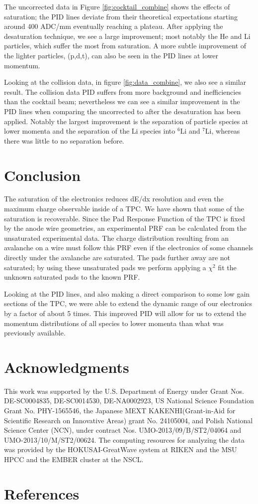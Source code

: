 \documentclass[review]{elsarticle}
\begin{document}
The uncorrected data in Figure \ref{fig:cocktail_combine} shows the effects of saturation; the PID lines deviate from their theoretical expectations starting around 400 ADC/mm eventually reaching a plateau. After applying the desaturation technique, we see a large improvement; most notably the He and Li particles, which suffer the most from saturation. A more subtle improvement of the lighter particles, (p,d,t), can also be seen in the PID lines at lower momentum.

Looking at the collision data, in figure \ref{fig:data_combine}, we also see a similar result. The collision data PID suffers from more background and inefficiencies than the cocktail beam; nevertheless we can see a similar improvement in the PID lines when comparing the uncorrected to after the desaturation has been applied. Notably the largest improvement is the separation of particle species at lower momenta and the separation of the Li species into ${}^{6}$Li and ${}^{7}$Li, whereas there was little to no separation before. 

\clearpage

\section{Conclusion}

The saturation  of the electronics reduces dE/dx resolution and even the maximum charge observable inside of a TPC.  We have shown that some of the saturation is recoverable. Since the Pad Response Function of the TPC is fixed by the anode wire geometries, an experimental PRF can be calculated from the unsaturated experimental data. The charge distribution resulting from an avalanche on a wire must follow this PRF even if the electronics of some channels directly under the avalanche are saturated. The pads further away are not saturated; by using these unsaturated pads we perform applying a $\chi^2$  fit the unknown saturated pads to the known PRF. 

Looking at the PID lines, and also making a direct comparison to some low gain sections of the TPC, we were able to extend the dynamic range of our electronics by a factor of about 5 times. This improved PID will allow for us to extend the momentum distributions of all species to lower momenta than what was previously available. 


\section{Acknowledgments}
This work was supported by the U.S. Department of Energy under Grant Nos.  DE-SC0004835,  DE-SC0014530, DE-NA0002923,  US  National Science Foundation Grant  No.  PHY-1565546, the  Japanese  MEXT  KAKENHI(Grant-in-Aid  for  Scientific  Research  on  Innovative  Areas)  grant  No. 24105004, and Polish National Science Center (NCN), under contract Nos. UMO-2013/09/B/ST2/04064 and UMO-2013/10/M/ST2/00624. The computing resources for analyzing the data was provided by the HOKUSAI-GreatWave system at RIKEN and the MSU HPCC and the EMBER cluster at the NSCL. 

\section*{References}


\end{document}
